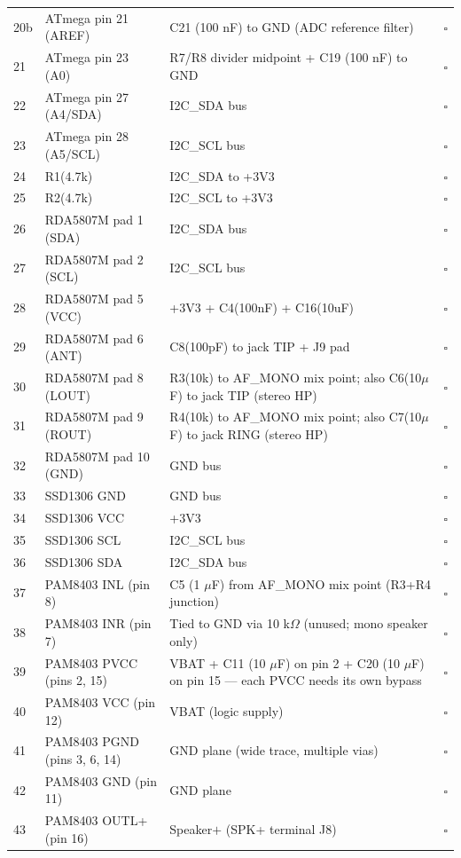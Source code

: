 \documentclass[a4paper,11pt]{article}
\renewcommand*{\,}{ }%
\begin{document}
\begin{longtable}{@{}p{0.5cm}p{5cm}p{5cm}p{1.5cm}@{}}
20b & ATmega pin 21 (AREF) & C21 (100\,nF) to GND (ADC reference filter) & $\square$ \\
21 & ATmega pin 23 (A0) & R7/R8 divider midpoint + C19 (100\,nF) to GND & $\square$ \\
22 & ATmega pin 27 (A4/SDA) & I2C\_SDA bus & $\square$ \\
23 & ATmega pin 28 (A5/SCL) & I2C\_SCL bus & $\square$ \\
24 & R1(4.7k) & I2C\_SDA to +3V3 & $\square$ \\
25 & R2(4.7k) & I2C\_SCL to +3V3 & $\square$ \\
26 & RDA5807M pad 1 (SDA) & I2C\_SDA bus & $\square$ \\
27 & RDA5807M pad 2 (SCL) & I2C\_SCL bus & $\square$ \\
28 & RDA5807M pad 5 (VCC) & +3V3 + C4(100nF) + C16(10uF) & $\square$ \\
29 & RDA5807M pad 6 (ANT) & C8(100pF) to jack TIP + J9 pad & $\square$ \\
30 & RDA5807M pad 8 (LOUT) & R3(10k) to AF\_MONO mix point; also C6(10$\mu$F) to jack TIP (stereo HP) & $\square$ \\
31 & RDA5807M pad 9 (ROUT) & R4(10k) to AF\_MONO mix point; also C7(10$\mu$F) to jack RING (stereo HP) & $\square$ \\
32 & RDA5807M pad 10 (GND) & GND bus & $\square$ \\
33 & SSD1306 GND & GND bus & $\square$ \\
34 & SSD1306 VCC & +3V3 & $\square$ \\
35 & SSD1306 SCL & I2C\_SCL bus & $\square$ \\
36 & SSD1306 SDA & I2C\_SDA bus & $\square$ \\
37 & PAM8403 INL (pin 8) & C5 (1\,$\mu$F) from AF\_MONO mix point (R3+R4 junction) & $\square$ \\
38 & PAM8403 INR (pin 7) & Tied to GND via 10\,k$\Omega$ (unused; mono speaker only) & $\square$ \\
39 & PAM8403 PVCC (pins 2, 15) & VBAT + C11 (10\,$\mu$F) on pin 2 + C20 (10\,$\mu$F) on pin 15 --- each PVCC needs its own bypass & $\square$ \\
40 & PAM8403 VCC (pin 12) & VBAT (logic supply) & $\square$ \\
41 & PAM8403 PGND (pins 3, 6, 14) & GND plane (wide trace, multiple vias) & $\square$ \\
42 & PAM8403 GND (pin 11) & GND plane & $\square$ \\
43 & PAM8403 OUTL+ (pin 16) & Speaker$+$ (SPK+ terminal J8) & $\square$ \\

\end{longtable}
\end{document}
